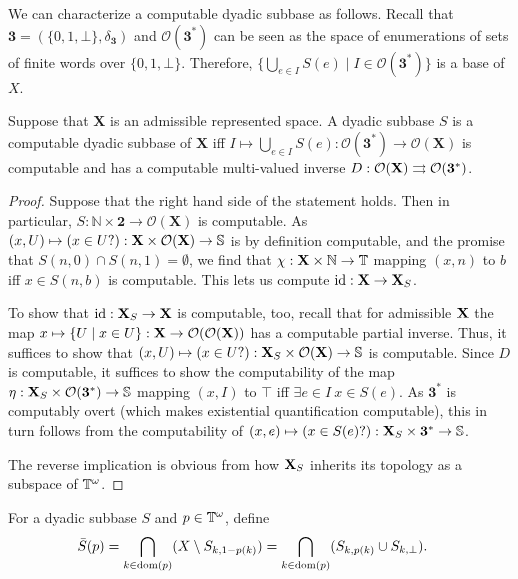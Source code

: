 \documentclass{eptcs-modified}
\begin{document}
We can characterize a computable dyadic subbase as follows.
Recall that $\mathbf{3} = (\{0,1,\bot\}, \delta_\mathbf{3})$ and
$\mathcal{O}(\mathbf{3}^*)$ can be seen as the space of enumerations of sets of finite words over $\{0,1,\bot\}$. Therefore, $\{\bigcup_{e \in I} S(e) \mid  I \in \mathcal{O}(\mathbf{3}^*)\}$ is a base of $X$.


\begin{proposition} \label{prop:computablepds}
Suppose that $\mathbf{X}$ is an admissible represented space.
A dyadic subbase $S$
is a computable dyadic subbase of $\mathbf{X}$ iff $I \mapsto \bigcup_{e \in I} S(e): \mathcal{O}(\mathbf{3}^*) \to \mathcal{O}(\mathbf{X})$ is computable and has a computable multi-valued inverse $D : \mathcal{O}(\mathbf{X}) \rightrightarrows \mathcal{O}(\mathbf{3}^*)$.

\begin{proof}
Suppose that the right hand side of the statement holds. Then in particular, $S : \mathbb{N} \times \mathbf{2} \to \mathcal{O}(\mathbf{X})$ is computable. As $(x,U) \mapsto (x \in U?) : \mathbf{X} \times \mathcal{O}(\mathbf{X}) \to \mathbb{S}$ is by definition computable, and the promise that $S(n,0) \cap S(n,1) = \emptyset$, we find that $\chi : \mathbf{X} \times \mathbb{N} \to \mathbb{T}$ mapping $(x,n)$ to $b$ iff $x \in S(n,b)$ is computable. This lets us compute $\textnormal{id} : \mathbf{X} \to \mathbf{X}_S$.

To show that $\textnormal{id} : \mathbf{X}_S \to \mathbf{X}$ is computable, too, recall that for admissible $\mathbf{X}$ the map $x \mapsto \{U \mid x \in U\} : \mathbf{X} \to \mathcal{O}(\mathcal{O}(\mathbf{X}))$ has a computable partial inverse. Thus, it suffices to show that $(x,U) \mapsto (x \in U?) : \mathbf{X}_S \times \mathcal{O}(\mathbf{X}) \to \mathbb{S}$ is computable.
Since $D$ is computable, it suffices to show the
computability of the map $\eta : \mathbf{X}_S \times \mathcal{O}(\mathbf{3}^*) \to \mathbb{S}$ mapping $(x,I)$ to $\top$ iff $\exists e \in I \ x \in S(e)$. As $\mathbf{3}^*$ is computably overt (which makes existential quantification computable), this in turn follows from the computability of $(x,e) \mapsto (x \in S(e)?) : \mathbf{X}_S \times \mathbf{3}^* \to \mathbb{S}$.

The reverse implication is obvious from how $\mathbf{X}_S$ inherits its topology as a subspace of $\mathbb{T}^\omega$.
\end{proof}
\end{proposition}


For a dyadic subbase $S$ and $p \in \mathbb{T}^{\omega}$, define
\begin{align}
&\bar{S}(p)= \bigcap_{k \in \operatorname{dom}(p)} (X \setminus {S_{k,1-p(k)}}) =
\bigcap_{k \in \operatorname{dom}(p)} ({S_{k,p(k)}} \cup {S_{k,{\bot}}}).
\end{align}
\end{document}
